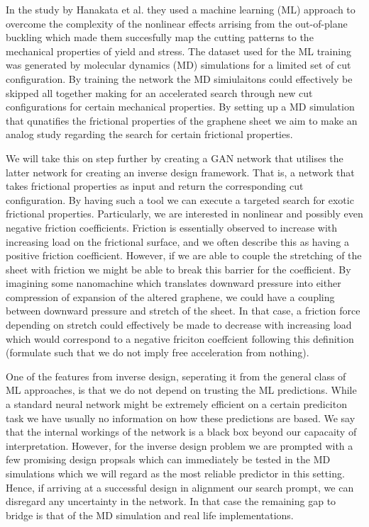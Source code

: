 In the study by Hanakata et al. \cite{PhysRevResearch.2.042006} they used a machine learning (ML) approach to overcome the complexity of the nonlinear effects arrising from the out-of-plane buckling which made them succesfully map the cutting patterns to the mechanical properties of yield and stress. The dataset used for the ML training was generated by molecular dynamics (MD) simulations for a limited set of cut configuration. By training the network the MD simiulaitons could effectively be skipped all together making for an accelerated search through new cut configurations for certain mechanical properties. By setting up a MD simulation that qunatifies the frictional properties of the graphene sheet we aim to make an analog study regarding the search for certain frictional properties. 

We will take this on step further by creating a GAN network that utilises the
latter network for creating an inverse design framework. That is, a network that
takes frictional properties as input and return the corresponding cut
configuration. By having such a tool we can execute a targeted search for exotic
frictional properties. Particularly, we are interested in nonlinear and possibly
even negative friction coefficients. Friction is essentially observed to
increase with increasing load on the frictional surface, and we often describe
this as having a positive friction coefficient. However, if we are able to
couple the stretching of the sheet with friction we might be able to break this barrier for the coefficient. By
imagining some nanomachine which translates downward pressure into either
compression of expansion of the altered graphene, we could have a coupling
between downward pressure and stretch of the sheet. In that case, a friction
force depending on stretch could effectively be made to decrease with increasing
load which would correspond to a negative friciton coeffcient following this
definition (formulate such that we do not imply free acceleration from nothing).

One of the features from inverse design, seperating it from the general class of ML approaches, is that we do not depend on trusting the ML predictions. While a standard neural network might be extremely efficient on a certain prediciton task we have usually no information on how these predictions are based. We say that the internal workings of the network is a black box beyond our capacaity of interpretation. However, for the inverse design problem we are prompted with a few promising design propsals which can immediately be tested in the MD simulations which we will regard as the most reliable predictor in this setting. Hence, if arriving at a successful design in alignment our search prompt, we can disregard any uncertainty in the network. In that case the remaining gap to bridge is that of the MD simulation and real life implementations. 




